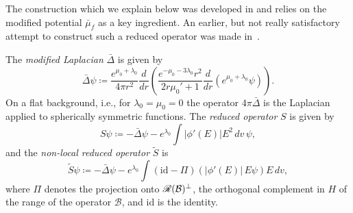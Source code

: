 \documentclass[11pt]{article}
\begin{document}
The construction which we explain below was developed in
\cite{HaLinRe} and relies on the modified
potential $\bar\mu_f$ as a key ingredient.
An earlier, but not really satisfactory attempt
to construct such a reduced operator was made in~\cite{Ip69}. 

The {\em modified Laplacian} $\bar \Delta$ is given by
\[ 
\bar \Delta \psi \coloneqq
\frac{e^{\mu_0+\lambda_0}}{4\pi r^2}
\frac{d}{dr}\left(\frac{e^{-\mu_0-3\lambda_0}r^2}{2r\mu_0'+1}
\frac{d}{dr} \left(e^{\mu_0+\lambda_0}\psi\right)\right).
\]
On a flat background, i.e., for $\lambda_0=\mu_0=0$ the
operator $ 4\pi \bar \Delta$ is the Laplacian applied to
spherically symmetric functions.
The {\em reduced operator} $S$ is given by
\begin{equation}\label{Sdef}
  S \psi \coloneqq 
  - \bar \Delta \psi
  - e^{\lambda_0}\int |\phi'(E)|E^2\,dv\,\psi,
\end{equation}
and the {\em non-local reduced operator}
$\tilde S$ is
\begin{equation}\label{Stildedef}
  \tilde S \psi \coloneqq 
  - \bar \Delta \psi
  - e^{\lambda_0}\int \left(\mathrm{id}-\Pi\right)
  \left(|\phi'(E)|\,E \psi \right) E\,dv,
\end{equation}
where $\Pi$ denotes the projection onto ${\mathscr R}(\mathcal B)^\perp$, the orthogonal
complement in $H$ of the range of the operator $\mathcal B$,
and $\mathrm{id}$ is the identity.
\end{document}
